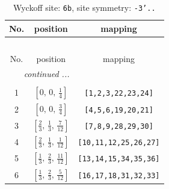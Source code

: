 \documentclass[fleqn,8pt]{jsarticle}
\begin{document}
\begin{longtable}{ccc}
\caption{Wyckoff site: {\tt 6b}, site symmetry: {\tt -3'..}}
 \\
 \hline \hline
No. & position & mapping \\ \hline \endfirsthead

\multicolumn{2}{l}{\tablename\ \thetable{}} \\
 \hline \hline
No. & position & mapping \\ \hline \endhead

 \hline \hline
\multicolumn{2}{r}{\footnotesize\it continued ...} \\ \endfoot

 \hline \hline
\multicolumn{2}{r}{} \\ \endlastfoot

1 & $\left[ 0,\, 0,\, \frac{1}{4} \right]$ & {\tt [1,2,3,22,23,24]} \\ \hline
2 & $\left[ 0,\, 0,\, \frac{3}{4} \right]$ & {\tt [4,5,6,19,20,21]} \\ \hline
3 & $\left[ \frac{2}{3},\, \frac{1}{3},\, \frac{7}{12} \right]$ & {\tt [7,8,9,28,29,30]} \\ \hline
4 & $\left[ \frac{2}{3},\, \frac{1}{3},\, \frac{1}{12} \right]$ & {\tt [10,11,12,25,26,27]} \\ \hline
5 & $\left[ \frac{1}{3},\, \frac{2}{3},\, \frac{11}{12} \right]$ & {\tt [13,14,15,34,35,36]} \\ \hline
6 & $\left[ \frac{1}{3},\, \frac{2}{3},\, \frac{5}{12} \right]$ & {\tt [16,17,18,31,32,33]} \\
\end{longtable}
\renewcommand{\arraystretch}{1.2}
\end{document}
